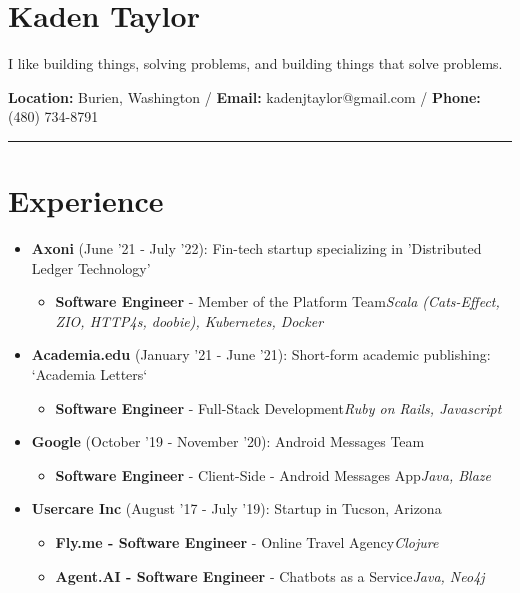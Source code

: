 \documentclass{article}
\begin{document}
\section*{Kaden Taylor}
I like building things, solving problems, and building things that solve problems.
\newline

\textbf{Location:} Burien, Washington /  \textbf{Email:} kadenjtaylor@gmail.com / \textbf{Phone:} (480) 734-8791
\newline
\noindent\rule{\linewidth}{1pt}

\section*{Experience}

\begin{itemize}
\item \textbf{Axoni} {(June '21 - July '22)}: Fin-tech startup specializing in 'Distributed Ledger Technology' 
\begin{itemize}
\item \textbf{Software Engineer} - Member of the Platform Team\newline \textit{Scala (Cats-Effect, ZIO, HTTP4s, doobie), Kubernetes, Docker}
\end{itemize}

\item \textbf{Academia.edu} {(January '21 - June '21)}: Short-form academic publishing: `Academia Letters` 
\begin{itemize}
\item \textbf{Software Engineer} - Full-Stack Development\newline \textit{Ruby on Rails, Javascript}
\end{itemize}

\item \textbf{Google} {(October '19 - November '20)}: Android Messages Team 
\begin{itemize}
\item \textbf{Software Engineer} - Client-Side - Android Messages App\newline \textit{Java, Blaze}
\end{itemize}

\item \textbf{Usercare Inc} {(August '17 - July '19)}: Startup in Tucson, Arizona 
\begin{itemize}
\item \textbf{Fly.me - Software Engineer} - Online Travel Agency\newline \textit{Clojure}
\item \textbf{Agent.AI - Software Engineer} - Chatbots as a Service\newline \textit{Java, Neo4j}
\end{itemize}


\end{itemize}
\end{document}

